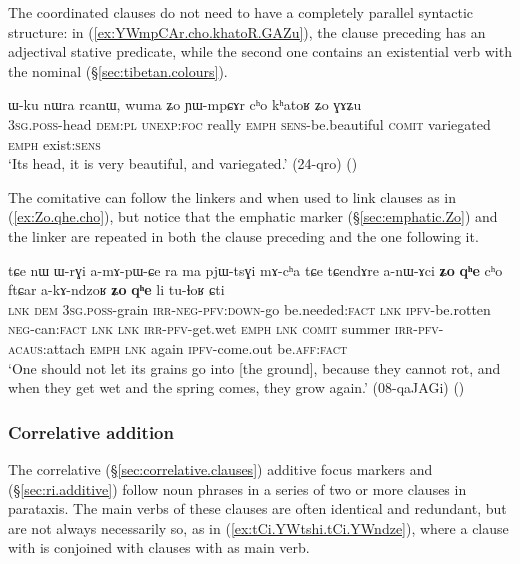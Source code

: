  The coordinated clauses do not need to have a completely parallel syntactic structure: in (\ref{ex:YWmpCAr.cho.khatoR.GAZu}), the clause preceding  has an adjectival stative predicate, while the second one contains an existential verb with the nominal  (§\ref{sec:tibetan.colours}).
 
\begin{exe}
\ex \label{ex:YWmpCAr.cho.khatoR.GAZu}
\gll   ɯ-ku nɯra rcanɯ, wuma ʑo ɲɯ-mpɕɤr cʰo kʰatoʁ ʑo ɣɤʑu \\
\textsc{3sg}.\textsc{poss}-head \textsc{dem}:\textsc{pl} \textsc{unexp}:\textsc{foc} really \textsc{emph} \textsc{sens}-be.beautiful \textsc{comit} variegated \textsc{emph} exist:\textsc{sens} \\
\glt `Its head, it is very beautiful, and variegated.' (24-qro)
()
\end{exe}

The comitative  can follow the linkers  and  when used to link clauses as in (\ref{ex:Zo.qhe.cho}), but notice that the emphatic marker (§\ref{sec:emphatic.Zo}) and the linker  are repeated in both the clause preceding  and the one following it.

\begin{exe}
\ex \label{ex:Zo.qhe.cho}
\gll tɕe nɯ ɯ-rɣi a-mɤ-pɯ-ɕe ra ma pjɯ-tsɣi mɤ-cʰa tɕe tɕendɤre a-nɯ-ɤci \textbf{ʑo} \textbf{qʰe} cʰo ftɕar a-kɤ-ndzoʁ \textbf{ʑo} \textbf{qʰe} li tu-ɬoʁ ɕti \\
\textsc{lnk} \textsc{dem} \textsc{3sg}.\textsc{poss}-grain \textsc{irr}-\textsc{neg}-\textsc{pfv}:\textsc{down}-go be.needed:\textsc{fact} \textsc{lnk} \textsc{ipfv}-be.rotten \textsc{neg}-can:\textsc{fact} \textsc{lnk} \textsc{lnk} \textsc{irr}-\textsc{pfv}-get.wet \textsc{emph} \textsc{lnk} \textsc{comit} summer \textsc{irr}-\textsc{pfv}-\textsc{acaus}:attach \textsc{emph} \textsc{lnk} again \textsc{ipfv}-come.out be.\textsc{aff}:\textsc{fact} \\
\glt `One should not let its grains go into [the ground], because they cannot rot, and when they get wet and the spring comes, they grow again.' (08-qaJAGi)
()
\end{exe}

 \subsubsection{Correlative addition} \label{sec:correlative.addition}
The correlative (§\ref{sec:correlative.clauses}) additive focus markers  and  (§\ref{sec:ri.additive}) follow noun phrases in a series of two or more clauses in parataxis. The main verbs of these clauses are often identical and redundant, but are not always necessarily so, as in (\ref{ex:tCi.YWtshi.tCi.YWndze}), where a clause with  is conjoined with clauses with  as main verb.

